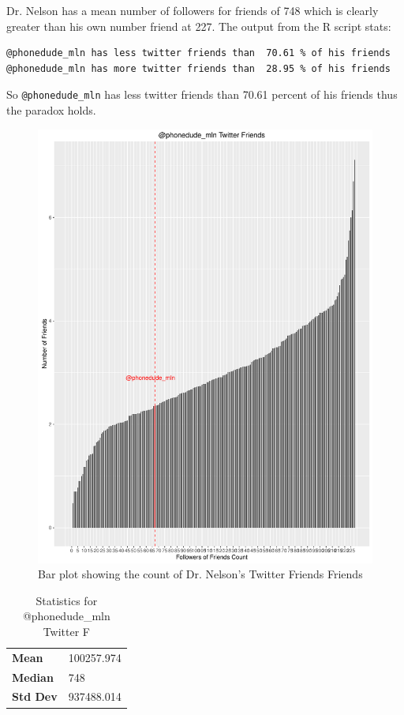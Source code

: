 \documentclass[letterpaper,10pt]{article}
\begin{document}
Dr. Nelson has a mean number of followers for friends of 748 which is clearly greater than his own number friend at 227. The output from the R script stats:
\begin{lstlisting}[frame=single]
@phonedude_mln has less twitter friends than  70.61 % of his friends
@phonedude_mln has more twitter friends than  28.95 % of his friends
\end{lstlisting}

So \verb+@phonedude_mln+ has less twitter friends than 70.61 percent of his friends thus the paradox holds.

\begin{figure}[h]
\includegraphics[scale=0.6]{mlnTwitterFriendParadox.pdf}
\caption{Bar plot showing the count of Dr. Nelson's Twitter Friends Friends}
\label{fig:twfp2}
\end{figure}
\begin{table}
\centering
\begin{tabular}{ l l }
\textbf{Mean} & 100257.974 \\
\textbf{Median} & 748 \\
\textbf{Std Dev} &  937488.014 \\
\end{tabular}
\caption{Statistics for @phonedude\_mln Twitter F}
\label{stats:twfst2}
\end{table}
 \newpage
 
 
\newpage
\clearpage

        
\end{document}
